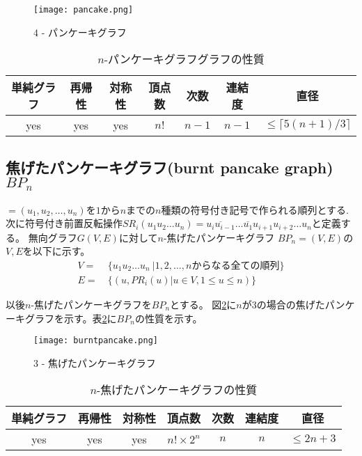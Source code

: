 \documentclass[specialreport]{subfiles}
\begin{document}
\begin{figure}[b]
\centering
\texttt{[image: pancake.png]}
\caption{$4$ - パンケーキグラフ}
\label{fig:4pancake}
\end{figure}


\begin{table}[htb]
  \begin{center}
    \caption{$n$-パンケーキグラフグラフの性質}
    \begin{tabular}{|c|c|c|c|c|c|c|} \hline
      単純グラフ&再帰性&対称性&頂点数&次数&連結度&直径 \\ \hline 
      yes&yes&yes&$n!$ & $n-1$&$n-1$& $ \leq \lceil 5(n + 1) /3 \rceil$ \\ \hline
    \end{tabular}
    \label{tab:pn_prop}
  \end{center}
\end{table}

\newpage
\subsection{焦げたパンケーキグラフ(burnt pancake graph)$BP_n$}
{\vu} $=(u_1, u_2, \dots, u_n)$を$1$から$n$までの$n$種類の符号付き記号で作られる順列とする.
次に符号付き前置反転操作$SR_i(u_1u_2\dots u_n)=\overline{u_iu_{i-1}}\dots \overline{u_1}u_{i+1}u_{i+2}\dots u_n$と定義する。
無向グラフ$G(V,E)$に対して$n$-焦げたパンケーキグラフ $BP_n=(V,E)$の$V, E$を以下に示す。
\begin{equation*}
\begin{split}
V = ~& \{u_1u_2\dots u_n ~|1,2,\dots ,n からなる全ての順列\}\\
E = ~&\{(u,PR_i(u) | u \in V, 1 \leq u \leq n)\}
\end{split}
\end{equation*}

以後$n$-焦げたパンケーキグラフを$BP_n$とする。
図\ref{fig:3burntpancake}に$n$が3の場合の焦げたパンケーキグラフを示す。表\ref{tab:bpn_prop}に$BP_n$の性質を示す。
\begin{figure}[b]
\centering
\texttt{[image: burntpancake.png]}
\caption{$3$ - 焦げたパンケーキグラフ}
\label{fig:3burntpancake}
\end{figure}


\begin{table}[httpb]
  \begin{center}
    \caption{$n$-焦げたパンケーキグラフの性質}
    \begin{tabular}{|c|c|c|c|c|c|c|} \hline
      単純グラフ&再帰性&対称性&頂点数&次数&連結度&直径 \\ \hline 
      yes&yes&yes&$n!\times 2^{n}$ & $n$&$n$& $ \leq 2n + 3$ \\ \hline
    \end{tabular}
        \label{tab:bpn_prop}
  \end{center}
\end{table}
\end{document}
